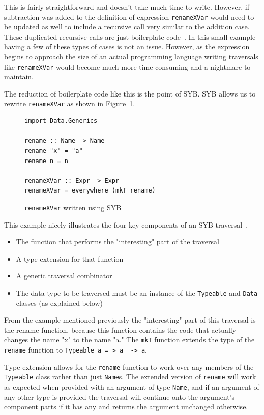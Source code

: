 	This is fairly straightforward and doesn't take much time to write. However, if subtraction was added to the definition of expression \texttt{renameXVar} would need to be updated as well to include a recursive call very similar to the addition case. These duplicated recursive calls are  just boilerplate code~\citep{syb}. In this small example having a few of these types of cases is not an issue. However, as the expression begins to approach the size of an actual programming language writing traversals like \texttt{renameXVar} would become much more time-consuming and a nightmare to maintain. 
	
	The reduction of boilerplate code like this is the point of SYB. SYB allows us to rewrite \texttt{renameXVar} as shown in Figure~\ref{renameSYB}.
	
	\begin{figure}[t]
	\begin{lstlisting}
import Data.Generics	
	
rename :: Name -> Name
rename "x" = "a"
rename n = n

renameXVar :: Expr -> Expr
renameXVar = everywhere (mkT rename)
\end{lstlisting}
\caption{\texttt{renameXVar} written using SYB}
\label{renameSYB}
\end{figure} 
	
This example nicely illustrates the four key components of an SYB traversal~\citep{syb}.

	\begin{itemize}
		\item The function that performs the "interesting" part of the traversal
		\item A type extension for that function
		\item A generic traversal combinator
		\item The data type to be traversed must be an instance of the \texttt{Typeable} and \texttt{Data} classes (as explained below)
	\end{itemize}
	
	From the example mentioned previously the "interesting" part of this traversal is the rename function, because this function contains the code that actually changes the name "x" to the name "a." The \texttt{mkT} function extends the type of the \texttt{rename} function to \texttt{Typeable~a = > a~ -> a}. 
	
	Type extension allows for the \texttt{rename} function to work over any members of the \texttt{Typeable} class rather than just \texttt{Name}s. The extended version of \texttt{rename} will work as expected when provided with an argument of type \texttt{Name}, and if an argument of any other type is provided the traversal will continue onto the argument's component parts if it has any and returns the argument unchanged otherwise.
	
